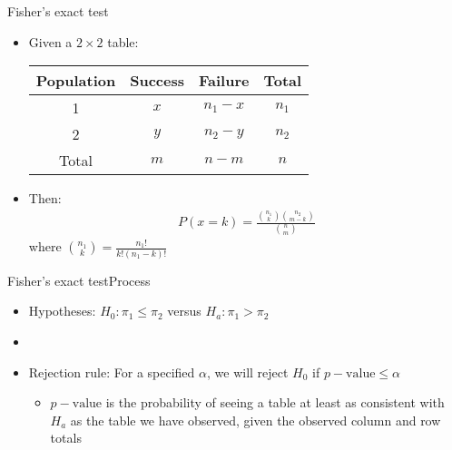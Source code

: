 \documentclass[xcolor=dvipsnames]{beamer}
\begin{document}
\begin{frame}{Fisher's exact test}
	\begin{itemize}
		\item Given a $2\times 2$ table:
		\begin{center}
			\begin{tabular}{c|cc|c}
				\hline
				\textbf{Population} & \textbf{Success} & \textbf{Failure} & \textbf{Total} \\ \hline \hline
				1 & $x$ &$n_1 -x$ & $n_1$\\
				2 & $y$ &$n_2-y$ & $n_2$ \\ \hline \hline
				Total & $m$ & $n-m$ & $n$ \\ \hline
			\end{tabular}
			\vspace{5mm}
		\end{center}
		\item Then: 
		\begin{gather*}
			P(x = k) = \frac{\binom{n_1}{k} \binom{n_2}{m-k}}{\binom{n}{m}}
		\end{gather*}
		where $\binom{n_1}{k} = \frac{n_1!}{k!(n_1-k)!}$
	\end{itemize} 
\end{frame}

\begin{frame}{Fisher's exact test}{Process}
	\begin{itemize}
		\item Hypotheses: $H_0: \pi_1 \leq \pi_2$ versus $H_a: \pi_1 > \pi_2$
		\item[]
		\item Rejection rule: For a specified $\alpha$, we will reject $H_0$ if $p-\text{value} \leq \alpha$
		\begin{itemize}
			\item $p-\text{value}$ is the probability of seeing a table at least as consistent with $H_a$ as the table we have observed, given the observed column and row totals
		\end{itemize}
	\end{itemize}
\end{frame}
\end{document}
